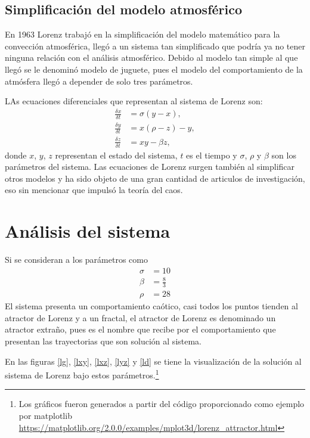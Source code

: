 \subsection{Simplificación del modelo atmosférico}
\noindent En 1963 Lorenz trabajó en la simplificación del modelo matemático para la convección atmosférica, llegó a un sistema tan simplificado que podría ya no tener ninguna relación con el análisis atmosférico. Debido al modelo tan simple al que llegó se le denominó modelo de juguete, pues el modelo del comportamiento de la atmósfera llegó a depender de solo tres parámetros.

LAs ecuaciones diferenciales que representan al sistema de Lorenz son:
\begin{align*}
\frac{\delta x}{\delta t} &= \sigma \left( y- x \right), \\
\frac{\delta y}{\delta t} &= x \left( \rho- z \right) -y, \\
\frac{\delta z}{\delta t} &= xy - \beta z,
\end{align*}
donde $x$, $y$, $z$ representan el estado del sistema, $t$ es el tiempo y $\sigma$, $\rho$ y $\beta$ son los parámetros del sistema. Las ecuaciones de Lorenz surgen también al simplificar otros modelos y ha sido  objeto de una gran cantidad de articulos de investigación, eso sin mencionar que impulsó la teoría del caos.

\section{Análisis del sistema}
Si se consideran a los parámetros como
\begin{align*}
\sigma & = 10 \\
\beta & = \frac{8}{3} \\
\rho & = 28
\end{align*}
El sistema presenta un comportamiento caótico, casi todos los puntos tienden al atractor de Lorenz y a un fractal, el atractor de Lorenz es denominado un atractor extraño, pues es el nombre que recibe por el comportamiento que presentan las trayectorias que son solución al sistema.\cite{atractor}

En las figuras \ref{lg}, \ref{lxy}, \ref{lxz}, \ref{lyz} y \ref{ld} se tiene la visualización de la solución al sistema de Lorenz bajo estos parámetros.\footnote{Los gráficos fueron generados a partir del código proporcionado como ejemplo por matplotlib \\ \url{https://matplotlib.org/2.0.0/examples/mplot3d/lorenz_attractor.html}}

